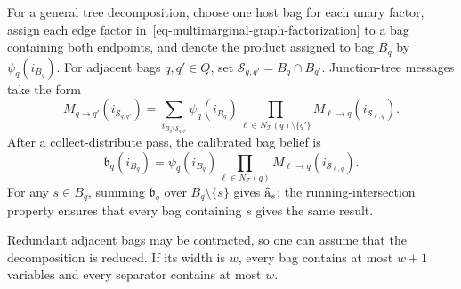 For a general tree decomposition, choose one host bag for each unary factor, assign each edge factor in~\eqref{eq-multimarginal-graph-factorization} to a bag containing both endpoints, and denote the product assigned to bag $B_q$ by $\psi_q(i_{B_q})$. For adjacent bags $q,q'\in Q$, set $\mathcal S_{q,q'}=B_q\cap B_{q'}$. Junction-tree messages take the form
\begin{equation}\label{eq-multimarginal-junction-message}
M_{q\to q'}(i_{\mathcal S_{q,q'}})
=
\sum_{i_{B_q\setminus\mathcal S_{q,q'}}}
\psi_q(i_{B_q})
\prod_{\ell\in N_{\mathcal T}(q)\setminus\{q'\}}
M_{\ell\to q}(i_{\mathcal S_{\ell,q}}).
\end{equation}
After a collect-distribute pass, the calibrated bag belief is
\begin{equation}\label{eq-multimarginal-junction-belief}
\mathfrak b_q(i_{B_q})
=
\psi_q(i_{B_q})
\prod_{\ell\in N_{\mathcal T}(q)}
M_{\ell\to q}(i_{\mathcal S_{\ell,q}}).
\end{equation}
For any $s\in B_q$, summing $\mathfrak b_q$ over $B_q\setminus\{s\}$ gives $\widehat{\mathrm{a}}_s$; the running-intersection property ensures that every bag containing $s$ gives the same result.

Redundant adjacent bags may be contracted, so one can assume that the decomposition is reduced. If its width is $w$, every bag contains at most $w+1$ variables and every separator contains at most $w$.

